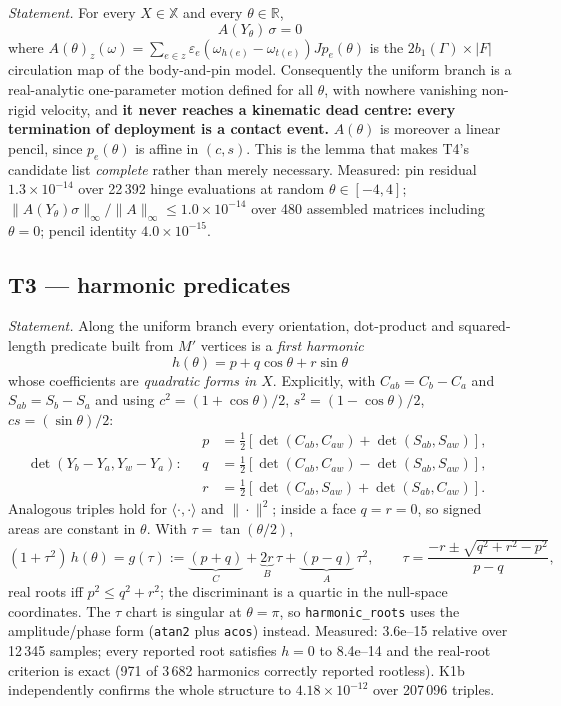 \documentclass[10pt,a4paper]{article}
\newcommand{\fn}[1]{\nolinkurl{#1}}
\begin{document}
\emph{Statement.} For every $X\in\mathbb X$ and every $\theta\in\mathbb R$,
\[
\boxed{\,A(Y_\theta)\,\sigma = 0\,}
\]
where $A(\theta)_z(\omega) = \sum_{e\in z}\varepsilon_e(\omega_{h(e)} - \omega_{t(e)})J p_e(\theta)$
is the $2b_1(\Gamma)\times|F|$ circulation map of the body-and-pin model. Consequently the
uniform branch is a real-analytic one-parameter motion defined for all $\theta$, with nowhere
vanishing non-rigid velocity, and \textbf{it never reaches a kinematic dead centre: every
termination of deployment is a contact event.} $A(\theta)$ is moreover a linear pencil, since
$p_e(\theta)$ is affine in $(c,s)$.
This is the lemma that makes T4's candidate list \emph{complete} rather than merely necessary.
Measured: pin residual $1.3\times10^{-14}$ over 22\,392 hinge evaluations at random
$\theta\in[-4,4]$; $\|A(Y_\theta)\sigma\|_\infty/\|A\|_\infty \le 1.0\times10^{-14}$ over 480
assembled matrices including $\theta=0$; pencil identity $4.0\times10^{-15}$.

\subsection{T3 --- harmonic predicates}

\emph{Statement.} Along the uniform branch every orientation, dot-product and squared-length
predicate built from $M'$ vertices is a \emph{first harmonic}
\[
h(\theta) = p + q\cos\theta + r\sin\theta
\]
whose coefficients are \emph{quadratic forms in $X$}. Explicitly, with
$C_{ab} = C_b - C_a$ and $S_{ab} = S_b - S_a$ and using
$c^2 = (1+\cos\theta)/2$, $s^2 = (1-\cos\theta)/2$, $cs = (\sin\theta)/2$:
\[
\det(Y_b - Y_a, Y_w - Y_a):\quad
\begin{aligned}
p &= \tfrac12[\det(C_{ab},C_{aw}) + \det(S_{ab},S_{aw})],\\
q &= \tfrac12[\det(C_{ab},C_{aw}) - \det(S_{ab},S_{aw})],\\
r &= \tfrac12[\det(C_{ab},S_{aw}) + \det(S_{ab},C_{aw})].
\end{aligned}
\]
Analogous triples hold for $\langle\cdot,\cdot\rangle$ and $\|\cdot\|^2$; inside a face
$q = r = 0$, so signed areas are constant in $\theta$.
With $\tau = \tan(\theta/2)$,
\[
(1+\tau^2)\,h(\theta) = g(\tau) := \underbrace{(p+q)}_{C} + \underbrace{2r}_{B}\,\tau + \underbrace{(p-q)}_{A}\,\tau^2 ,
\qquad
\tau = \frac{-r \pm \sqrt{q^2+r^2-p^2}}{p-q},
\]
real roots iff $p^2 \le q^2+r^2$; the discriminant is a quartic in the null-space coordinates.
The $\tau$ chart is singular at $\theta=\pi$, so \fn{harmonic_roots} uses the amplitude/phase
form (\texttt{atan2} plus \texttt{acos}) instead.
Measured: 3.6e--15 relative over 12\,345 samples; every reported root satisfies $h=0$ to
8.4e--14 and the real-root criterion is exact (971 of 3\,682 harmonics correctly reported
rootless). K1b independently confirms the whole structure to $4.18\times10^{-12}$ over
207\,096 triples.
\end{document}
